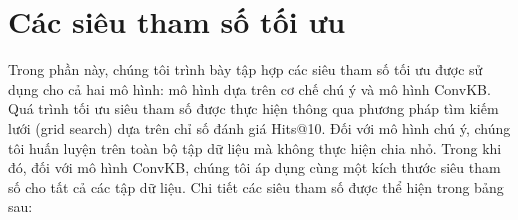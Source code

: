 \appendix
\renewcommand{\chaptername}{Phụ lục}

\chapter{Các siêu tham số tối ưu}
\label{appendix:Appendix1}

Trong phần này, chúng tôi trình bày tập hợp các siêu tham số tối ưu được sử dụng cho cả hai mô hình: mô hình dựa trên cơ chế chú ý và mô hình ConvKB. Quá trình tối ưu siêu tham số được thực hiện thông qua phương pháp tìm kiếm lưới (grid search) dựa trên chỉ số đánh giá Hits@10. Đối với mô hình chú ý, chúng tôi huấn luyện trên toàn bộ tập dữ liệu mà không thực hiện chia nhỏ. Trong khi đó, đối với mô hình ConvKB, chúng tôi áp dụng cùng một kích thước siêu tham số cho tất cả các tập dữ liệu. Chi tiết các siêu tham số được thể hiện trong bảng sau:

\begin{table}[htbp]
	\begin{center}
	\end{center}
\end{table}
